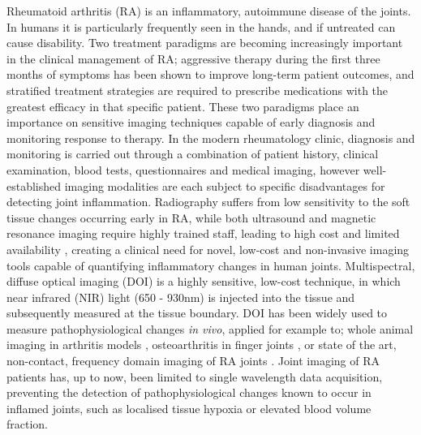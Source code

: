 \documentclass[twoside]{bhamthesis}
\theoremstyle{definition}
\begin{document}
Rheumatoid arthritis (RA) is an inflammatory, autoimmune disease of the joints. In humans it is particularly frequently seen in the hands, and if untreated can cause disability. Two treatment paradigms are becoming increasingly important in the clinical management of RA; aggressive therapy during the first three months of symptoms has been shown to improve long-term patient outcomes, and stratified treatment strategies are required to prescribe medications with the greatest efficacy in that specific patient. These two paradigms place an importance on sensitive imaging techniques capable of early diagnosis and monitoring response to therapy. In the modern rheumatology clinic, diagnosis and monitoring is carried out through a combination of patient history, clinical examination, blood tests, questionnaires and medical imaging, however well-established imaging modalities are each subject to specific disadvantages for detecting joint inflammation. Radiography suffers from low sensitivity to the soft tissue changes occurring early in RA, while both ultrasound and magnetic resonance imaging require highly trained staff, leading to high cost and limited availability \cite{golovko2011optical}, creating a clinical need for novel, low-cost and non-invasive imaging tools capable of quantifying inflammatory changes in human joints. Multispectral, diffuse optical imaging (DOI) is a highly sensitive, low-cost technique, in which near infrared (NIR) light (650 - 930nm) is injected into the tissue and subsequently measured at the tissue boundary. DOI has been widely used to measure pathophysiological changes \textit{in vivo}, applied for example to; whole animal imaging in arthritis models \cite{glinton2017diagnosing}, osteoarthritis in finger joints \cite{yuan2007three}, or state of the art, non-contact, frequency domain imaging of RA joints \cite{hielscher2011frequency}. Joint imaging of RA patients has, up to now, been limited to single wavelength data acquisition, preventing the detection of pathophysiological changes known to occur in inflamed joints, such as localised tissue hypoxia or elevated blood volume fraction.
\end{document}
